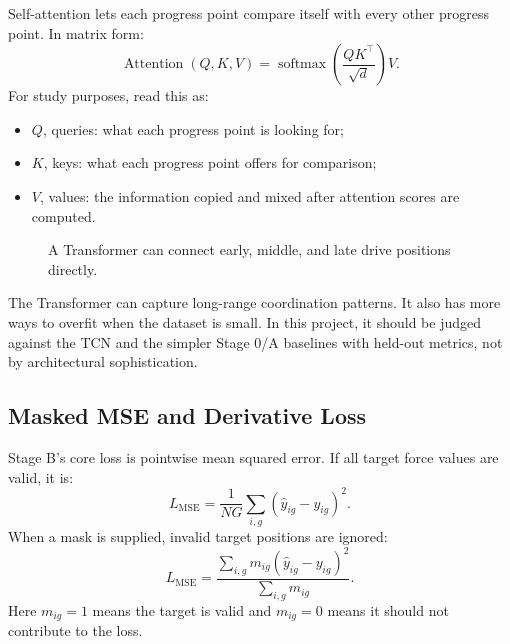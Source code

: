 \documentclass[11pt]{article}
\begin{document}
Self-attention lets each progress point compare itself with every other
progress point. In matrix form:
\[
  \operatorname{Attention}(Q,K,V)
  =
  \operatorname{softmax}
  \left(\frac{QK^\top}{\sqrt{d}}\right)V.
\]
For study purposes, read this as:
\begin{itemize}[leftmargin=*]
  \item \(Q\), queries: what each progress point is looking for;
  \item \(K\), keys: what each progress point offers for comparison;
  \item \(V\), values: the information copied and mixed after attention scores
  are computed.
\end{itemize}

\begin{figure}[H]
  \centering
  \caption{A Transformer can connect early, middle, and late drive positions
  directly.}
  \label{fig:stageb-attention}
\end{figure}

The Transformer can capture long-range coordination patterns. It also has more
ways to overfit when the dataset is small. In this project, it should be judged
against the TCN and the simpler Stage 0/A baselines with held-out metrics, not
by architectural sophistication.

\subsection{Masked MSE and Derivative Loss}

Stage B's core loss is pointwise mean squared error. If all target force values
are valid, it is:
\[
  L_{\text{MSE}}
  =
  \frac{1}{NG}
  \sum_{i,g}(\hat{y}_{ig}-y_{ig})^2.
\]
When a mask is supplied, invalid target positions are ignored:
\[
  L_{\text{MSE}}
  =
  \frac{\sum_{i,g}m_{ig}(\hat{y}_{ig}-y_{ig})^2}
  {\sum_{i,g}m_{ig}}.
\]
Here \(m_{ig}=1\) means the target is valid and \(m_{ig}=0\) means it should
not contribute to the loss.
\end{document}
